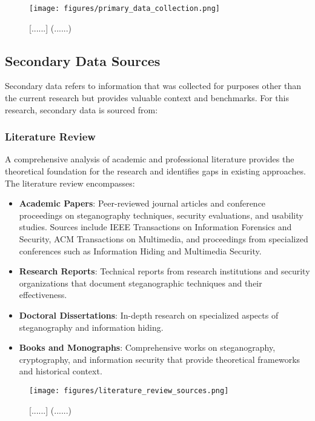 \documentclass[12pt, a4paper, oneside]{book}
\begin{document}
\begin{figure}[htbp]
    \centering
    \texttt{[image: figures/primary\_data\_collection.png]}
    \caption{[......] (......)}
    \label{fig:primary_data}
\end{figure}

\subsection{Secondary Data Sources}

Secondary data refers to information that was collected for purposes other than the current research but provides valuable context and benchmarks. For this research, secondary data is sourced from:

\subsubsection{Literature Review}
A comprehensive analysis of academic and professional literature provides the theoretical foundation for the research and identifies gaps in existing approaches. The literature review encompasses:

\begin{itemize}[leftmargin=*]
    \item \textbf{Academic Papers}: Peer-reviewed journal articles and conference proceedings on steganography techniques, security evaluations, and usability studies. Sources include IEEE Transactions on Information Forensics and Security, ACM Transactions on Multimedia, and proceedings from specialized conferences such as Information Hiding and Multimedia Security.

    \item \textbf{Research Reports}: Technical reports from research institutions and security organizations that document steganographic techniques and their effectiveness.

    \item \textbf{Doctoral Dissertations}: In-depth research on specialized aspects of steganography and information hiding.

    \item \textbf{Books and Monographs}: Comprehensive works on steganography, cryptography, and information security that provide theoretical frameworks and historical context.
\end{itemize}

\begin{figure}[htbp]
    \centering
    \texttt{[image: figures/literature\_review\_sources.png]}
    \caption{[......] (......)}
    \label{fig:literature_sources}
\end{figure}
\end{document}

